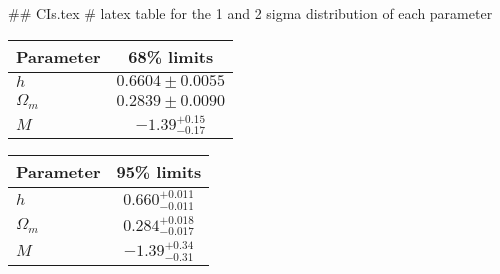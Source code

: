 ## CIs.tex
# latex table for the 1 and 2 sigma distribution of each parameter

\begin{tabular} { l  c}
 Parameter &  68\% limits\\
\hline
{\boldmath$h              $} & $0.6604\pm 0.0055          $\\
{\boldmath$\Omega_m       $} & $0.2839\pm 0.0090          $\\
{\boldmath$M              $} & $-1.39^{+0.15}_{-0.17}     $\\
\hline
\end{tabular}

\begin{tabular} { l  c}
 Parameter &  95\% limits\\
\hline
{\boldmath$h              $} & $0.660^{+0.011}_{-0.011}   $\\
{\boldmath$\Omega_m       $} & $0.284^{+0.018}_{-0.017}   $\\
{\boldmath$M              $} & $-1.39^{+0.34}_{-0.31}     $\\
\hline
\end{tabular}
